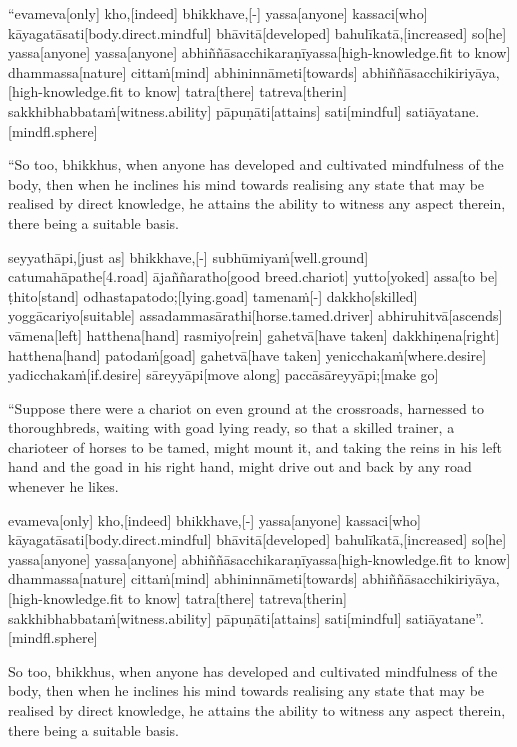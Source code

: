 \begin{samepage}
\begingl[glneveryline={\PaliGlossA,\PaliGlossB}]
“evameva[only] kho,[indeed] bhikkhave,[-] yassa[anyone] kassaci[who] kāyagatāsati[body.direct.mindful] bhāvitā[developed] bahulīkatā,[increased] so[he] yassa[anyone] yassa[anyone] abhiññāsacchikaraṇīyassa[high-knowledge.fit to know] dhammassa[nature] cittaṁ[mind] abhininnāmeti[towards] abhiññāsacchikiriyāya,[high-knowledge.fit to know] tatra[there] tatreva[therin] sakkhibhabbataṁ[witness.ability] pāpuṇāti[attains] sati[mindful] satiāyatane.[mindfl.sphere]
\endgl
\nopagebreak
\linespread{0.5}
\begin{spacin}{0.2}
{\PaliGlossFT “So too, bhikkhus, when anyone has developed and cultivated mindfulness of the body, then when he inclines his mind towards realising any state that may be realised by direct knowledge, he attains the ability to witness any aspect therein, there being a suitable basis.}
\end{spacin}
\vskip 12pt
\end{samepage}
\begin{samepage}
\begingl[glneveryline={\PaliGlossA,\PaliGlossB}]
seyyathāpi,[just as] bhikkhave,[-] subhūmiyaṁ[well.ground] catumahāpathe[4.road] ājaññaratho[good breed.chariot] yutto[yoked] assa[to be] ṭhito[stand] odhastapatodo;[lying.goad] tamenaṁ[-] dakkho[skilled] yoggācariyo[suitable] assadammasārathi[horse.tamed.driver] abhiruhitvā[ascends] vāmena[left] hatthena[hand] rasmiyo[rein] gahetvā[have taken] dakkhiṇena[right] hatthena[hand] patodaṁ[goad] gahetvā[have taken] yenicchakaṁ[where.desire] yadicchakaṁ[if.desire] sāreyyāpi[move along] paccāsāreyyāpi;[make go]
\endgl
\nopagebreak
\linespread{0.5}
\begin{spacin}{0.2}
{\PaliGlossFT “Suppose there were a chariot on even ground at the crossroads, harnessed to thoroughbreds, waiting with goad lying ready, so that a skilled trainer, a charioteer of horses to be tamed, might mount it, and taking the reins in his left hand and the goad in his right hand, might drive out and back by any road whenever he likes.}
\end{spacin}
\vskip 12pt
\end{samepage}
\begin{samepage}
\begingl[glneveryline={\PaliGlossA,\PaliGlossB}]
evameva[only] kho,[indeed] bhikkhave,[-] yassa[anyone] kassaci[who] kāyagatāsati[body.direct.mindful] bhāvitā[developed] bahulīkatā,[increased] so[he] yassa[anyone] yassa[anyone] abhiññāsacchikaraṇīyassa[high-knowledge.fit to know] dhammassa[nature] cittaṁ[mind] abhininnāmeti[towards] abhiññāsacchikiriyāya,[high-knowledge.fit to know] tatra[there] tatreva[therin] sakkhibhabbataṁ[witness.ability] pāpuṇāti[attains] sati[mindful] satiāyatane”.[mindfl.sphere]
\endgl
\nopagebreak
\linespread{0.5}
\begin{spacin}{0.2}
{\PaliGlossFT So too, bhikkhus, when anyone has developed and cultivated mindfulness of the body, then when he inclines his mind towards realising any state that may be realised by direct knowledge, he attains the ability to witness any aspect therein, there being a suitable basis.}
\end{spacin}
\vskip 12pt
\end{samepage}
